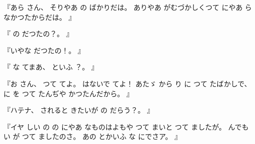 %
『あら
さん、
%
そりやあ
の
ばかりだは。
%
ありやあ
がむづかしくつて
にやあ
らなかつたからだは。
』

%
『
の
だつたの？。
』

%
『いやな
だつたの！。
』

%
『
な
てまあ、
%
といふ
？。
』

%
『お
さん、
%
つて
てよ。
%
はないで
てよ！
あたゞ
から
り
に
つて
たばかしで、
%
に
を
つて
たんぢや
かつたんだから。
』

%
『ハテナ、
%
されると
きたいが
の
だらう？。
』

%
『イヤ
しい
の
の
にやあ
なものはよもや
つて
まいと
つて
ましたが。
%
んでも
い
が
つて
ましたのさ。
%
あの
とかいふ
な
にでさア。
』
